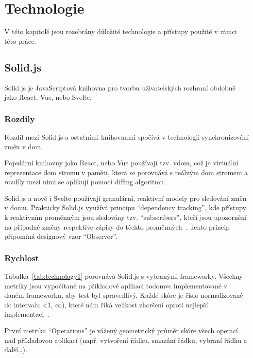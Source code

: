 \chapter{Technologie}

V této kapitolě jsou rozebrány důležité technologie a přístupy použité v rámci této práce.

\section{Solid.js}

Solid.js je JavaScriptová knihovna pro tvorbu uživatelských rozhraní obdobně jako React, Vue, nebo Svelte.


\subsection{Rozdíly}

Rozdíl mezi Solid.js a ostatními knihovnami spočívá v technologii synchronizování změn v \gls{dom}.

Populární knihovny jako React, nebo Vue používají tzv. \gls{vdom}, což je virtuální reprezentace \gls{dom} stromu v paměti, která se porovnává s reálným \gls{dom} stromem a rozdíly mezi nimi se aplikují pomocí diffing algoritmu.

Solid.js a nově i Svelte používají granulární, reaktivní modely pro sledování změn v domu.
Prakticky Solid.js využívá principu “dependency tracking”, kde přístupy k reaktivním proměnným jsou sledovány tzv. “subscribers”, kteří jsou upozornění na případné změny respektive zápisy do těchto proměnných~\cite{solid-reactivity}.
Tento princip připomíná designový vzor “Observer”.

\subsection{Rychlost}

Tabulka~\ref{tab:technology1} porovnává Solid.js s vybranými frameworky.
Všechny metriky jsou vypočítané na příkladové aplikaci \gls{todomvc} implementované v daném frameworku, aby test byl spravedlivý.
Každé skóre je číslo normalizované do intervalu <1, $\infty$), které nám říká velikost zhoršení oproti nejlepší implementaci~\cite{krausest120,krausest122}.

První metrika ``Operations'' je vážený geometrický průměr skóre všech operací nad příkladovou aplikací (např. vytvoření řádku, smazání řádku, vybraní řádku a další\dots).

